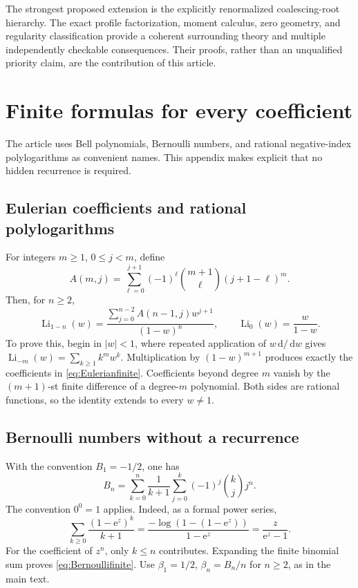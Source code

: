 \documentclass[11pt,letterpaper]{article}
\numberwithin{equation}{section}
\theoremstyle{definition}
\theoremstyle{remark}
\newcommand{\dd}{\,\mathrm d}
\newcommand{\Li}{\operatorname{Li}}
\newcommand{\e}{\mathrm e}
\begin{document}
The strongest proposed extension is the explicitly renormalized coalescing-root hierarchy. The exact profile factorization, moment calculus, zero geometry, and regularity classification provide a coherent surrounding theory and multiple independently checkable consequences. Their proofs, rather than an unqualified priority claim, are the contribution of this article.

\appendix
\section{Finite formulas for every coefficient}
\label{app:finite}

The article uses Bell polynomials, Bernoulli numbers, and rational negative-index polylogarithms as convenient names. This appendix makes explicit that no hidden recurrence is required.

\subsection{Eulerian coefficients and rational polylogarithms}
For integers \(m\geq1\), \(0\leq j<m\), define
\begin{equation}
 A(m,j)=\sum_{\ell=0}^{j+1}(-1)^\ell
                    \binom{m+1}{\ell}(j+1-\ell)^m.
 \label{eq:Eulerianfinite}
\end{equation}
Then, for \(n\geq2\),
\begin{equation}
 \Li_{1-n}(w)=
 \frac{\displaystyle\sum_{j=0}^{n-2}A(n-1,j)w^{j+1}}{(1-w)^n},
 \qquad \Li_0(w)=\frac{w}{1-w}.
 \label{eq:Lifinite}
\end{equation}
To prove this, begin in \(|w|<1\), where repeated application of \(w\dd/\dd w\) gives \(\Li_{-m}(w)=\sum_{k\geq1}k^mw^k\). Multiplication by \((1-w)^{m+1}\) produces exactly the coefficients in \eqref{eq:Eulerianfinite}. Coefficients beyond degree \(m\) vanish by the \((m+1)\)-st finite difference of a degree-\(m\) polynomial. Both sides are rational functions, so the identity extends to every \(w\ne1\).

\subsection{Bernoulli numbers without a recurrence}
With the convention \(B_1=-1/2\), one has
\begin{equation}
 B_n=\sum_{k=0}^n\frac1{k+1}\sum_{j=0}^k(-1)^j\binom{k}{j}j^n.
 \label{eq:Bernoullifinite}
\end{equation}
The convention \(0^0=1\) applies. Indeed, as a formal power series,
\[
 \sum_{k\geq0}\frac{(1-\e^z)^k}{k+1}
 =\frac{-\log(1-(1-\e^z))}{1-\e^z}
 =\frac{z}{\e^z-1}.
\]
For the coefficient of \(z^n\), only \(k\leq n\) contributes. Expanding the finite binomial sum proves \eqref{eq:Bernoullifinite}. Use \(\beta_1=1/2\), \(\beta_n=B_n/n\) for \(n\geq2\), as in the main text.
\end{document}
